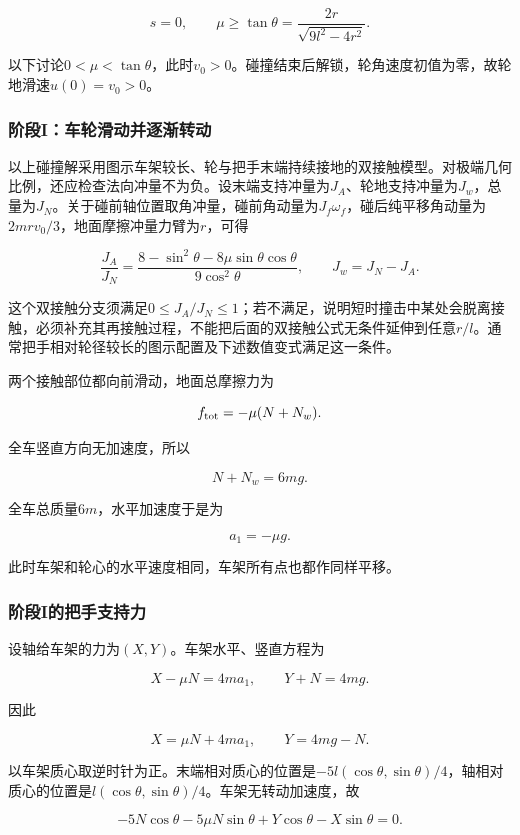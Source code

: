 \documentclass[12pt,a4paper,fontset=fandol]{ctexart}
\begin{document}
\[
\boxed{s=0,\qquad
\mu\ge\tan\theta
=\frac{2r}{\sqrt{9l^2-4r^2}}}.
\]

以下讨论\(0<\mu<\tan\theta\)，此时\(v_0>0\)。碰撞结束后解锁，轮角速度初值为零，故轮地滑速\(u(0)=v_0>0\)。

\subsubsection{阶段I：车轮滑动并逐渐转动}\label{ux9636ux6bb5iux8f66ux8f6eux6ed1ux52a8ux5e76ux9010ux6e10ux8f6cux52a8}

以上碰撞解采用图示车架较长、轮与把手末端持续接地的双接触模型。对极端几何比例，还应检查法向冲量不为负。设末端支持冲量为\(J_A\)、轮地支持冲量为\(J_w\)，总量为\(J_N\)。关于碰前轴位置取角冲量，碰前角动量为\(J_f\omega_f\)，碰后纯平移角动量为\(2mr v_0/3\)，地面摩擦冲量力臂为\(r\)，可得

\[
\frac{J_A}{J_N}
=\frac{8-\sin^2\theta-8\mu\sin\theta\cos\theta}
{9\cos^2\theta},
\qquad J_w=J_N-J_A.
\]

这个双接触分支须满足\(0\le J_A/J_N\le1\)；若不满足，说明短时撞击中某处会脱离接触，必须补充其再接触过程，不能把后面的双接触公式无条件延伸到任意\(r/l\)。通常把手相对轮径较长的图示配置及下述数值变式满足这一条件。

两个接触部位都向前滑动，地面总摩擦力为

\[
f_{\rm tot}=-\mu(N+N_w).
\]

全车竖直方向无加速度，所以

\[
N+N_w=6mg.
\]

全车总质量\(6m\)，水平加速度于是为

\[
\boxed{a_1=-\mu g}.
\]

此时车架和轮心的水平速度相同，车架所有点也都作同样平移。

\subsubsection{阶段I的把手支持力}\label{ux9636ux6bb5iux7684ux628aux624bux652fux6301ux529b}

设轴给车架的力为\((X,Y)\)。车架水平、竖直方程为

\[
X-\mu N=4ma_1,\qquad
Y+N=4mg.
\]

因此

\[
X=\mu N+4ma_1,\qquad Y=4mg-N.
\]

以车架质心取逆时针为正。末端相对质心的位置是\(-5l(\cos\theta,\sin\theta)/4\)，轴相对质心的位置是\(l(\cos\theta,\sin\theta)/4\)。车架无转动加速度，故

\[
-5N\cos\theta-5\mu N\sin\theta
+Y\cos\theta-X\sin\theta=0.
\]
\end{document}
